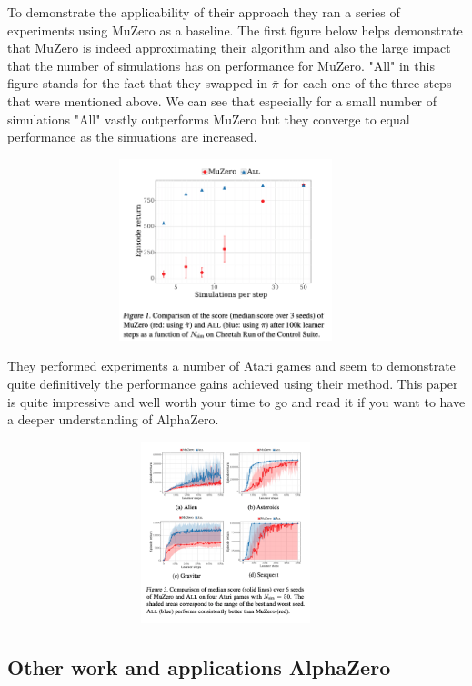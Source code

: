 To demonstrate the applicability of their approach they ran a series of experiments using MuZero as a baseline. The first figure below helps demonstrate that MuZero is indeed approximating their algorithm and also the large impact that the number of simulations has on performance for MuZero. "All" in this figure stands for the fact that they swapped in $\bar{\pi}$ for each one of the three steps that were mentioned above. We can see that especially for a small number of simulations "All" vastly outperforms MuZero but they converge to equal performance as the simuations are increased. 

\begin{figure}[H]
       \centering
       \includegraphics[width=400px,height=200px]{experiments/mcts_reg_figure_1.png}
       \label{fig:my_label}
\end{figure}

They performed experiments a number of Atari games and seem to demonstrate quite definitively the performance gains achieved using their method. This paper is quite impressive and well worth your time to go and read it if you want to have a deeper understanding of AlphaZero.  


\begin{figure}[H]
       \centering
       \includegraphics[width=400px,height=200px]{experiments/mcts_reg_figure_3.png}
       \label{fig:my_label}
\end{figure}

\subsection{Other work and applications AlphaZero}

